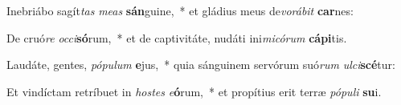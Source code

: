 \item Inebriábo sagít\textit{tas} \textit{me}\textit{as} \textbf{sán}guine,~* et gládius meus de\textit{vo}\textit{rá}\textit{bit} \textbf{car}nes:
\item De cruó\textit{re} \textit{oc}\textit{ci}\textbf{só}rum,~* et de captivitáte, nudáti ini\textit{mi}\textit{có}\textit{rum} \textbf{cá}\textbf{pi}tis.
\item Laudáte, gentes, \textit{pó}\textit{pu}\textit{lum} \textbf{e}jus,~* quia sánguinem servórum suó\textit{rum} \textit{ul}\textit{ci}\textbf{scé}tur:
\item Et vindíctam retríbuet in \textit{hos}\textit{tes} \textit{e}\textbf{ó}rum,~* et propítius erit terræ \textit{pó}\textit{pu}\textit{li} \textbf{su}i.
